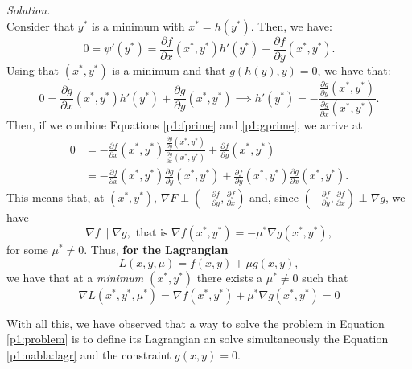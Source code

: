 \documentclass[a4paper]{article}
\newenvironment{solution}
    {\textit{Solution.}\\}
    {}
\begin{document}
\begin{solution}
Consider that \(y^*\) is a minimum with \(x^* = h(y^*)\). Then, we have:
\begin{equation}\label{p1:fprime}
0 = \psi'(y^*) = \frac{\partial f}{\partial x} (x^*, y^*)h'(y^*) + \frac{\partial f}{\partial y}(x^*, y^*).
\end{equation}
Using that \((x^*,y^*)\) is a minimum and that \(g(h(y),y) = 0\), we have that:
\begin{equation}\label{p1:gprime}
0 = \frac{\partial g}{\partial x}(x^*, y^*)h'(y^*) + \frac{\partial g}{\partial y}(x^*, y^*) \implies h'(y^*) = - \frac{\frac{\partial g}{\partial y}(x^{*},y^{*})}{\frac{\partial g}{\partial x}(x^{*},y^{*})}.
\end{equation}
Then, if we combine Equations \eqref{p1:fprime} and \eqref{p1:gprime}, we arrive at
\begin{align*}
0 & = - \frac{\partial f}{\partial x}(x^*,y^*) \frac{\frac{\partial g}{\partial y}(x^{*},y^{*})}{\frac{\partial g}{\partial x}(x^{*},y^{*})} + \frac{\partial f}{\partial y}(x^*, y^*)\\
& = - \frac{\partial f}{\partial x}(x^*,y^*)\frac{\partial g}{\partial y}(x^{*},y^{*}) +  \frac{\partial f}{\partial y}(x^*, y^*)\frac{\partial g}{\partial x}(x^{*},y^{*}).
\end{align*}
This means that, at \((x^*,y^*)\), \(\nabla F \perp \left(- \frac{\partial f}{\partial y}, \frac{\partial f}{\partial x}\right)\) and, since \(\left(- \frac{\partial f}{\partial y}, \frac{\partial f}{\partial x}\right) \perp \nabla g\), we have 
\[
\nabla f \parallel \nabla g, \text{ that is } \nabla f(x^*,y^*) = -\mu^* \nabla g(x^*,y^*),
\]
for some \(\mu^* \neq 0\). Thus, \textbf{for the Lagrangian}
\[
L(x,y,\mu) = f(x,y) + \mu g(x,y),
\]
we have that at a \emph{minimum} \((x^*,y^*)\) there exists a \(\mu^* \neq 0\) such that
\begin{equation}\label{p1:nabla:lagr}
\nabla L(x^*,y^*,\mu^*) = \nabla f(x^*,y^*) + \mu^* \nabla g(x^*,y^*) = 0 
\end{equation}

With all this, we have observed that a way to solve the problem in Equation \eqref{p1:problem} is to define its Lagrangian an solve simultaneously the Equation \eqref{p1:nabla:lagr} and the constraint \(g(x,y) = 0\).

\end{solution}
\end{document}
